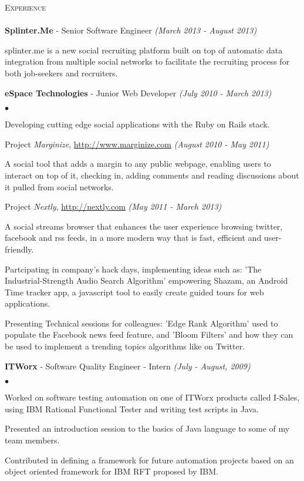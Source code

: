\documentclass[letterpaper,12pt]{article}
\newcommand{\lineunder}{\vspace*{-8pt} \\ \hspace*{-8pt} \hrulefill \\}
\newcommand{\interval}[1]{\textit{(#1)} }
\newcommand{\header}[1]{{\hspace*{0pt}\vspace*{6pt} \textsc{#1}} \vspace*{-6pt} \lineunder}
\newcommand{\employer}[3]{{\textbf{#1} - {#3} \interval{#2}\\ }}
\newenvironment{achievements}{\begin{list}{$\bullet$}{\topsep 0pt \itemsep -2pt}}{\vspace*{4pt}\end{list}}
\newenvironment{details}{\vspace*{-4pt} \begin{list}{\topsep 0pt \itemsep -2pt}}{\vspace*{4pt}\end{list}}
\begin{document}
\header{Experience}
\employer{Splinter.Me}{March 2013 - August 2013}{Senior Software Engineer}
  \begin{details}
    \item splinter.me is a new social recruiting platform built on top of automatic data integration from multiple social networks to facilitate the recruiting process for both job-seekers and recruiters.
  \end{details}
\employer{eSpace Technologies}{July 2010 - March 2013}{Junior Web Developer}
  \begin{achievements}
    \item Developing cutting edge social applications with the Ruby on Rails stack.
    \item Project \textit{Marginize}, \url{http://www.marginize.com} \interval{August 2010 - May 2011}
    \begin{details}
      \item A social tool that adds a margin to any public webpage, enabling users to interact on top of it, checking in, adding comments and reading discussions about it pulled from social networks. 
    \end{details}
    \item Project \textit{Nextly}, \url{http://nextly.com} \interval{May 2011 - March 2013}
    \begin{details}
      \item A social streams browser that enhances the user experience browsing twitter, facebook and rss feeds, in a more modern way that is fast, efficient and user-friendly. 
    \end{details}
    \item Partcipating in company's hack days, implementing ideas such as: 'The Industrial-Strength Audio Search Algorithm' empowering Shazam, an Android Time tracker app, a javascript tool to easily create guided tours for web applications.
    \item Presenting Technical sessions for colleagues: 'Edge Rank Algorithm' used to populate the Facebook news feed feature, and 'Bloom Filters' and how they can be used to implement a trending topics algorithms like on Twitter.
  \end{achievements}
\vspace*{4pt}
\employer{ITWorx}{July - August, 2009}{Software Quality Engineer - Intern}
  \begin{achievements}
    \item Worked on software testing automation on one of ITWorx products called I-Sales, using IBM Rational Functional Tester and writing test scripts in Java.
    \item Presented an introduction session to the basics of Java language to some of my team members.
    \item Contributed in defining a framework for future automation projects based on an object oriented framework for IBM RFT proposed by IBM.
  \end{achievements}
\vspace*{4pt}
\end{document}
